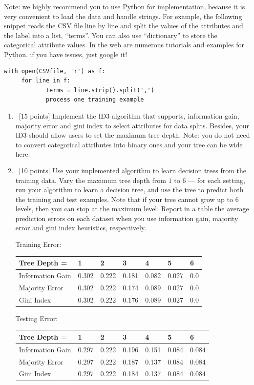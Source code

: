 \documentclass[12pt, fullpage,letterpaper]{article}
\begin{document}
\begin{enumerate}
\noindent Note: we highly recommend you to use Python for implementation, because it is very convenient to load the data and handle strings. For example, the following snippet reads the CSV file line by line and split the values of the attributes and the label into a list, ``terms''. You can also use ``dictionary'' to store the categorical attribute values. In the web are numerous tutorials and examples for Python. if you have issues, just google it!
\begin{lstlisting}
with open(CSVfile, 'r') as f:
     for line in f:
            terms = line.strip().split(',')
            process one training example
\end{lstlisting}
\begin{enumerate}
\item~[15 points] Implement the ID3 algorithm that supports, information gain,  majority error and gini index to select attributes for data splits. Besides, your ID3 should allow users to set the maximum tree depth. Note: you do not need to convert categorical attributes into binary ones and your tree can be wide here. 
\item~[10 points] Use your implemented algorithm to learn decision trees from the training data. Vary the maximum  tree depth from $1$ to $6$  --- for each setting, run your algorithm to learn a decision tree, and use the tree to  predict both the training  and test examples. Note that if your tree cannot grow up to 6 levels, then you can stop at the maximum level. Report in a table the average prediction errors on each dataset when you use information gain, majority error and gini index heuristics, respectively.

  \newline
Training Error:
\begin{table}[h]
	\begin{tabular}{l||llllll}
		Tree Depth = & 1 & 2 & 3 & 4 & 5 & 6 \\
		\hline\hline
		Information Gain & 0.302 & 0.222 & 0.181 & 0.082 & 0.027 & 0.0 \\
		Majority Error & 0.302 & 0.222 & 0.174 & 0.089 & 0.027 & 0.0 \\
		Gini Index & 0.302 & 0.222 & 0.176 & 0.089 & 0.027 & 0.0
	\end{tabular}
\end{table}

Testing Error:
\begin{table}[h]
	\begin{tabular}{l||llllll}
		Tree Depth = & 1 & 2 & 3 & 4 & 5 & 6 \\
		\hline\hline
		Information Gain & 0.297 & 0.222 & 0.196 & 0.151 & 0.084 & 0.084 \\
		Majority Error & 0.297 & 0.222 & 0.187 & 0.137 & 0.084 & 0.084 \\
		Gini Index & 0.297 & 0.222 & 0.184 & 0.137 & 0.084 & 0.084
	\end{tabular}
\end{table}


\end{enumerate}
\end{enumerate}
\end{document}
